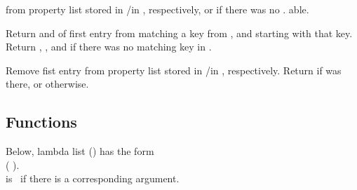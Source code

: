 \begin{LIST}{1cm}
  \label{:property_lists}
  {
   from property list stored in
  /in , respectively, or  if
  there was no . able.
  }

  {
  Return  and  of first entry from 
  matching a key from , and  starting with that key. Return \retval{\NIL},
  \retvalii{\NIL}, and  \retvaliii{\NIL} if there was no matching key
  in .
  }

  {
  Remove fist entry  from property list stored in
  /in , respectively. Return \retval{\T} if 
  was there, or \retval{\NIL} otherwise.
  }

\end{LIST}


\subsection{Functions}
\label{section:Functions}


\begin{flushleft}
  Below, lambda list () has the form\\
  (
  ).\\
   is \T\ if there is a corresponding argument.
\end{flushleft}

